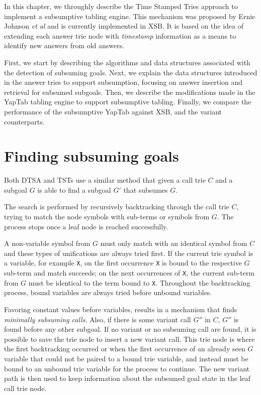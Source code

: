 In this chapter, we throughly describe the Time Stamped Tries approach
to implement a subsumptive tabling engine. This mechanism was proposed by
Ernie Johnson \textit{et al} \cite{Johnson-99} and is currently implemented in XSB.
It is based on the idea of extending each answer trie node with \textit{timestamp}
information as a means to identify new answers from old answers.

First, we start by describing the algorithms and data structures associated
with the detection of subsuming goals. Next, we explain the data structures
introduced in the answer tries to support subsumption, focusing on answer insertion
and retrieval for subsumed subgoals. Then, we describe the modifications made in the YapTab
tabling engine to support subsumptive tabling. Finally, we compare the performance of
the subsumptive YapTab against XSB, and the variant counterparts.

\section{Finding subsuming goals}

Both DTSA and TSTs use a similar method that given a call trie $C$ and a subgoal $G$
is able to find a subgoal $G'$ that subsumes $G$.

The search is performed by recursively backtracking through the call trie $C$, trying
to match the node symbols with sub-terms or symbols from $G$. The process stops
once a leaf node is reached successfully.

A non-variable symbol from $G$ must only match with an identical symbol from $C$ and
these types of unifications are always tried first.
If the current trie symbol is a variable, for example \texttt{X}, on the first occurrence \texttt{X}
is bound to the respective $G$ sub-term
and match succeeds; on the next occurrences of \texttt{X}, the current sub-term from $G$ must
be identical to the term bound to \texttt{X}. Throughout the backtracking process, bound variables are
always tried before unbound variables.

Favoring constant values before variables, results in a mechanism that finds \textit{minimally subsuming calls}.
Also, if there is some variant call $G''$ in $C$, $G''$ is found before any other subgoal. If no variant 
or no subsuming call are found, it is possible to save the trie node to insert a new variant call.
This trie node is where the first backtracking occurred or when the first occurrence of
an already seen $G$ variable that could not be paired to a bound trie variable, and instead
must be bound to an unbound trie variable for the process to continue.
The new variant path is then used to keep information about the subsumed goal state in
the leaf call trie node.

